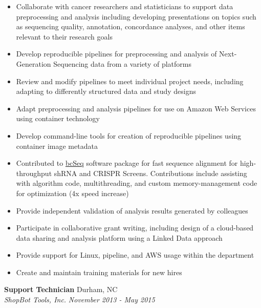\documentclass[10pt]{article}
\begin{document}
\begin{itemize}\raggedright
\setlength{\itemsep}{0pt}

\item Collaborate with cancer researchers and statisticians to support data preprocessing and analysis including developing presentations on topics such as sequencing quality, annotation, concordance analyses, and other items relevant to their research goals

\item Develop reproducible pipelines for preprocessing
  and analysis of Next-Generation Sequencing data
  from a variety of platforms

\item Review and modify pipelines to meet individual project needs, including adapting to differently structured data and study designs
  
\item Adapt preprocessing and analysis pipelines for use on
 Amazon Web Services using container technology

\item Develop command-line tools for creation of reproducible pipelines
  using container image metadata
  
\item Contributed to \href{https://github.com/jl354/bcSeq}{bcSeq} software
    package for fast sequence alignment for high-throughput shRNA and CRISPR Screens. Contributions include assisting with algorithm code, multithreading, and custom memory-management code for optimization (4x speed increase)

\item Provide independent validation of analysis results generated by colleagues

\item Participate in collaborative grant writing, including design of a cloud-based data sharing and analysis platform using a Linked Data approach
  
\item Provide support for Linux, pipeline, and AWS usage within the department
  
\item Create and maintain training materials for new hires
 
\end{itemize}
\break

\noindent
{\bf Support Technician} \hfill Durham, NC\\
{\it ShopBot Tools, Inc.} \hfill {\it November 2013 - May 2015}
\end{document}
